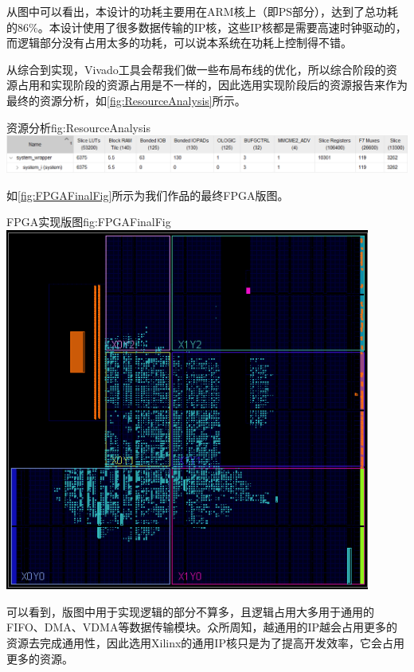 \documentclass[supercite]{HustGraduPaper}
\begin{document}
从图中可以看出，本设计的功耗主要用在ARM核上（即PS部分），达到了总功耗的86\%。本设计使用了很多数据传输的IP核，这些IP核都是需要高速时钟驱动的，而逻辑部分没有占用太多的功耗，可以说本系统在功耗上控制得不错。

从综合到实现，Vivado工具会帮我们做一些布局布线的优化，所以综合阶段的资源占用和实现阶段的资源占用是不一样的，因此选用实现阶段后的资源报告来作为最终的资源分析，如\autoref{fig:ResourceAnalysis}所示。

\begin{generalfig}[htb]{资源分析}{fig:ResourceAnalysis}
	\includegraphics[width=\textwidth]{Figures/ResourceAnalysis.png}
\end{generalfig}


如\autoref{fig:FPGAFinalFig}所示为我们作品的最终FPGA版图。


\begin{generalfig}[htb]{FPGA实现版图}{fig:FPGAFinalFig}
	\includegraphics[width=12cm]{Figures/FPGAFinalFig.png}
\end{generalfig}

可以看到，版图中用于实现逻辑的部分不算多，且逻辑占用大多用于通用的FIFO、DMA、VDMA等数据传输模块。众所周知，越通用的IP越会占用更多的资源去完成通用性，因此选用Xilinx的通用IP核只是为了提高开发效率，它会占用更多的资源。
\end{document}
